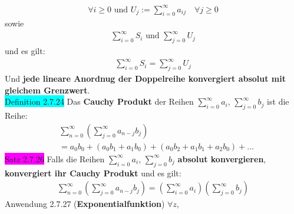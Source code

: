 \documentclass[landscape, 10pt]{article}
\begin{document}
\begin{multicols}{3}
\begin{align*}
                            \forall i\geqslant0
                            \text{ und }
                            U_j:=\sum_{i=0}^\infty a_{ij} \quad
                            \forall j\geqslant0
                     \end{align*}
                     sowie 
                     \begin{align*}
                            \sum_{i=0}^\infty S_i
                            \text{ und }
                            \sum_{j=0}^\infty U_j
                     \end{align*}
                     und es gilt:
                     \begin{align*}
                            \sum_{i=0}^\infty S_i
                            =\sum_{j=0}^\infty U_j
                     \end{align*}
                     Und \textbf{jede lineare Anordnug 
                     der Doppelreihe konvergiert 
                     absolut mit gleichem Grenzwert}.\\
              \colorbox{cyan}{Definition 2.7.24} 
                     Das \textbf{Cauchy Produkt} der Reihen 
                     \textcolor{NavyBlue}{$\sum_{i=0}^\infty a_i$},
                     \textcolor{NavyBlue}{$\sum_{j=0}^\infty b_j$} 
                     ist die Reihe: 
                     \begin{align*}
                            &\sum_{n=0}^\infty
                            (\sum_{j=0}^\infty a_{n-j}b_j)\\
                            &=a_0b_0+(a_0b_1+a_1b_0)
                            +(a_0b_2+a_1b_1+a_2b_0)+...
                     \end{align*}
              \colorbox{magenta}{Satz 2.7.26} Falls die Reihen 
                     \textcolor{NavyBlue}{$\sum_{i=0}^\infty a_i$},
                     \textcolor{NavyBlue}{$\sum_{j=0}^\infty b_j$}
                     \textbf{absolut konvergieren}, 
                     \textbf{konvergiert ihr Cauchy Produkt}
                     und es gilt: 
                     \begin{align*}
                            \sum_{n=0}^\infty
                            (\sum_{j=0}^\infty a_{n-j}b_j)
                            =(\sum_{i=0}^\infty a_i)
                            (\sum_{j=0}^\infty b_j)
                     \end{align*}
              \colorbox{Dandelion}{Anwendung 2.7.27} 
              (\textbf{Exponentialfunktion})
                     \textcolor{NavyBlue}{$\forall z$},

\end{multicols}
\end{document}
